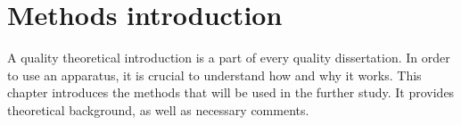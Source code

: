 \chapter{Methods introduction}\label{chapter:methods}
\thispagestyle{chapterBeginStyle}
A quality theoretical introduction is a part of every quality dissertation. In order to use an apparatus, it is crucial to understand how and why it works. This chapter introduces the methods that will be used in the further study. It provides theoretical background, as well as necessary comments.



